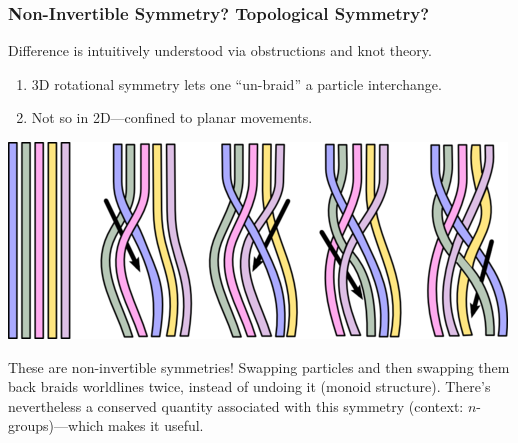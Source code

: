 \documentclass[10pt]{beamer}
\begin{document}
\begin{frame}
  \frametitle{Non-Invertible Symmetry? Topological Symmetry?}
  Difference is intuitively understood via obstructions and knot theory.
  \begin{enumerate}
  \item 3D rotational symmetry lets one ``un-braid'' a particle interchange.
  \item Not so in 2D---confined to planar movements.
  \end{enumerate}
  \begin{center}
    \includegraphics[scale=1.2]{braid.png}
  \end{center}
  These are non-invertible symmetries!
  Swapping particles and then swapping them back braids worldlines twice, instead of undoing it (monoid structure).
  There's nevertheless a conserved quantity associated with this symmetry (context: $n$-groups)---which makes it useful.
\end{frame}
\end{document}

